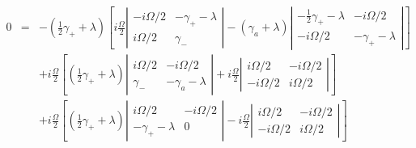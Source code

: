 \documentclass[twocolumn,aps,eqsecnum,showkeys,amsmath]{revtex4-2}
\begin{document}
\begin{widetext}
\begin{eqnarray*}
0 &=& -(\frac{1}{2} \gamma_+ +\lambda) \left[ i \frac{\Omega}{2}
	\left| \begin{array}{cc} 	-i\Omega/2 & -\gamma_+ -\lambda 		\\ 
	i\Omega/2 & \gamma_- 	\end{array}  \right| 
%	
-(\gamma_a +\lambda) \left| \begin{array}{cc}
	-\frac{1}{2} \gamma_+ -\lambda & -i\Omega/2 	 \\ 
	-i\Omega/2 & -\gamma_+ -\lambda 		
	\end{array}  \right|	\right] 	\\ 
%
&& +i \frac{\Omega}{2} \left[  (\frac{1}{2} \gamma_+ +\lambda) 
	 \left| \begin{array}{cc} 	i\Omega/2 & -i\Omega/2 \\ 
	\gamma_- & -\gamma_a -\lambda   \end{array}  \right| 	
% 
+ i \frac{\Omega}{2} \left| \begin{array}{cc}
	i \Omega/2 & -i\Omega/2  		\\ 
	-i \Omega/2 & i\Omega/2 	\end{array}  	\right| 	\right] \\
%
&& +i \frac{\Omega}{2} \left[  (\frac{1}{2} \gamma_+ +\lambda) 
	 \left| \begin{array}{cc} 	i\Omega/2 & -i\Omega/2 \\ 
	-\gamma_+ -\lambda & 0  \end{array}  \right| 	
% 
- i \frac{\Omega}{2} \left| \begin{array}{cc}
	i \Omega/2 & -i\Omega/2  		\\ 
	-i \Omega/2 & i\Omega/2 	\end{array}  	\right|   \right] 
\end{eqnarray*}


\end{widetext}
\end{document}
